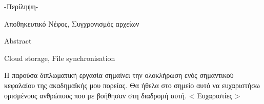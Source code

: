\begin{abstractgr}
  -Περίληψη-
\begin{keywordsgr}
Αποθηκευτικό Νέφος, Συγχρονισμός αρχείων
\end{keywordsgr}
\end{abstractgr}


\begin{abstracten}
  Abstract
\begin{keywordsen}
Cloud storage, File synchronisation
\end{keywordsen}
\end{abstracten}


\begin{acknowledgementsgr}
  Η παρούσα διπλωματική εργασία σημαίνει την ολοκλήρωση ενός σημαντικού
  κεφαλαίου της ακαδημαϊκής μου πορείας. Θα ήθελα στο σημείο αυτό να
  ευχαριστήσω ορισμένους ανθρώπους που με βοήθησαν στη διαδρομή αυτή.
  < Ευχαριστίες >
\end{acknowledgementsgr}
